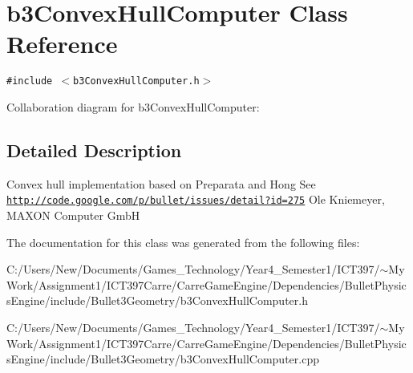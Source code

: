 \hypertarget{classb3_convex_hull_computer}{
\section{b3ConvexHullComputer Class Reference}
\label{classb3_convex_hull_computer}
}
{\tt \#include $<$b3ConvexHullComputer.h$>$}

Collaboration diagram for b3ConvexHullComputer:

\subsection{Detailed Description}
Convex hull implementation based on Preparata and Hong See \href{http://code.google.com/p/bullet/issues/detail?id=275}{\tt http://code.google.com/p/bullet/issues/detail?id=275} Ole Kniemeyer, MAXON Computer GmbH 

The documentation for this class was generated from the following files:\begin{CompactItemize}
\item 
C:/Users/New/Documents/Games\_\-Technology/Year4\_\-Semester1/ICT397/$\sim$My Work/Assignment1/ICT397Carre/CarreGameEngine/Dependencies/BulletPhysicsEngine/include/Bullet3Geometry/b3ConvexHullComputer.h\item 
C:/Users/New/Documents/Games\_\-Technology/Year4\_\-Semester1/ICT397/$\sim$My Work/Assignment1/ICT397Carre/CarreGameEngine/Dependencies/BulletPhysicsEngine/include/Bullet3Geometry/b3ConvexHullComputer.cpp\end{CompactItemize}
